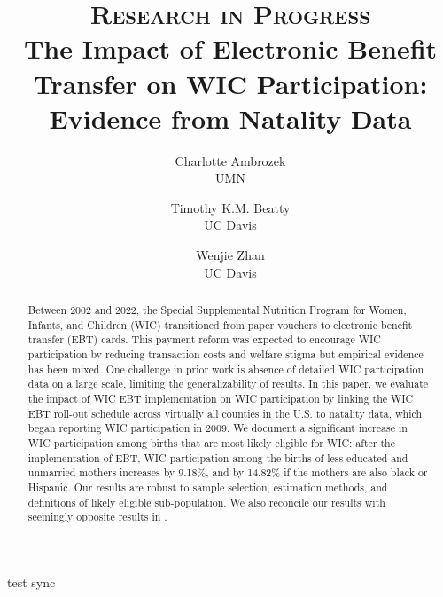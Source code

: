\documentclass[a4paper,twoside,11pt]{article}
\begin{document}
\title{\vspace{0.8\baselineskip} 
\textsc{Research in Progress} \\ The Impact of Electronic Benefit Transfer on WIC Participation: Evidence from Natality Data}
\author{Charlotte Ambrozek \\ UMN \and Timothy K.M. Beatty \\ UC Davis \and Wenjie Zhan \\ UC Davis}
\maketitle

\begin{abstract}
Between 2002 and 2022, the Special Supplemental Nutrition Program for Women, Infants, and Children
(WIC) transitioned from paper vouchers to electronic benefit transfer (EBT) cards. This payment reform
was expected to encourage WIC participation by reducing transaction costs and welfare stigma but empirical evidence has been mixed. One challenge in prior work is absence of detailed WIC participation data on a large scale, limiting
the generalizability of results. In this paper, we evaluate the impact of WIC EBT implementation on WIC
participation by linking the WIC EBT roll-out schedule across virtually all counties in the U.S. to natality
data, which began reporting WIC participation in 2009. We document a significant increase in WIC participation among births that are most likely eligible for WIC: after the implementation of EBT, WIC participation among the births of less educated and unmarried mothers increases by 9.18\%, and by 14.82\% if the mothers are also black or Hispanic. Our results are robust to sample selection, estimation methods, and definitions of likely eligible sub-population. We also reconcile our results with seemingly opposite results in \cite{meckel2020cure}.
\end{abstract}

\clearpage








test sync

\clearpage

\begin{spacing}{1.25}
\newpage


\end{spacing}
\end{document}
